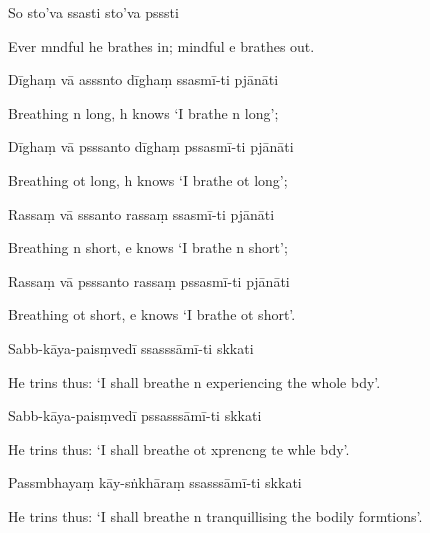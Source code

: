 So sto'va ssasti sto'va psssti

\begin{english}
  Ever mndful he brathes in; mindful e brathes out.
\end{english}

Dīghaṃ vā asssnto dīghaṃ ssasmī-ti pjānāti

\begin{english}
  Breathing n long, h knows `I brathe n long';
\end{english}

Dīghaṃ vā psssanto dīghaṃ pssasmī-ti pjānāti

\begin{english}
  Breathing ot long, h knows `I brathe ot long';
\end{english}

Rassaṃ vā sssanto rassaṃ ssasmī-ti pjānāti

\begin{english}
  Breathing n short, e knows `I brathe n short';
\end{english}

Rassaṃ vā psssanto rassaṃ pssasmī-ti pjānāti

\begin{english}
  Breathing ot short, e knows `I brathe ot short'.
\end{english}

Sabb-kāya-paisṃvedī ssasssāmī-ti skkati

\begin{english}
  He trins thus: `I shall breathe n experiencing the whole bdy'.
\end{english}

Sabb-kāya-paisṃvedī pssasssāmī-ti skkati

\begin{english}
  He trins thus: `I shall breathe ot xprencng te whle bdy'.
\end{english}

Passmbhayaṃ kāy-sṅkhāraṃ ssasssāmī-ti skkati

\begin{english}
  He trins thus: `I shall breathe n tranquillising the bodily formtions'.
\end{english}

